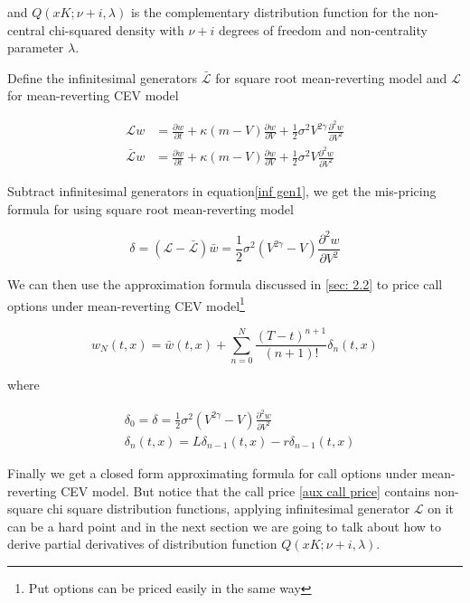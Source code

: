 \noindent and $Q(xK ; \nu+i, \lambda)$ is the complementary distribution function for the non-central chi-squared density with $\nu + i$ degrees of freedom and non-centrality parameter $\lambda$.

Define the infinitesimal generators $\bar{\mathcal{L}}$ for square root mean-reverting model and $\mathcal{L}$ for mean-reverting CEV model

\begin{equation}\label{inf gen1}
    \begin{aligned}
        \mathcal{L} w&= \frac{\partial w}{\partial t}+\kappa(m - V) \frac{\partial w}{\partial V}+\frac{1}{2} \sigma^{2} V^{2\gamma} \frac{\partial^{2} w}{\partial V^{2}} \\
        \bar{\mathcal{L}} w &= \frac{\partial w}{\partial t}+\kappa(m - V) \frac{\partial w}{\partial V}+\frac{1}{2} \sigma^{2} V \frac{\partial^{2} w}{\partial V^{2}}
    \end{aligned}
\end{equation}

Subtract infinitesimal generators in equation\eqref{inf gen1}, we get the mis-pricing formula for using square root mean-reverting model

$$
\delta = (\mathcal{L} - \bar{\mathcal{L}}) \bar{w} = \frac{1}{2} \sigma^{2} (V^{2\gamma} - V) \frac{\partial^{2} w}{\partial V^{2}}
$$

\noindent We can then use the approximation formula discussed in \ref{sec: 2.2} to price call options under mean-reverting CEV model\footnote{Put options can be priced easily in the same way}

\begin{equation} \label{cev approx formula}
    w_{N}(t, x)=\bar{w}(t,x)+\sum_{n=0}^{N} \frac{(T-t)^{n+1}}{(n+1) !} \delta_{n}(t, x)
\end{equation}

\noindent where

\begin{equation}\label{mispricing}
    \begin{aligned}
        &\delta_0 = \delta = \frac{1}{2} \sigma^{2} (V^{2\gamma} - V) \frac{\partial^{2} w}{\partial V^{2}} \\
        &\delta_{n}(t, x)=L \delta_{n-1}(t, x)- r\delta_{n-1}(t, x)
        \end{aligned}
\end{equation}

Finally we get a closed form approximating formula for call options under mean-reverting CEV model. But notice that the call price \eqref{aux call price} contains non-square chi square distribution functions, applying infinitesimal generator $\mathcal{L}$ on it can be a hard point and in the next section we are going to talk about how to derive partial derivatives of distribution function $Q(xK; \nu+i, \lambda)$.

